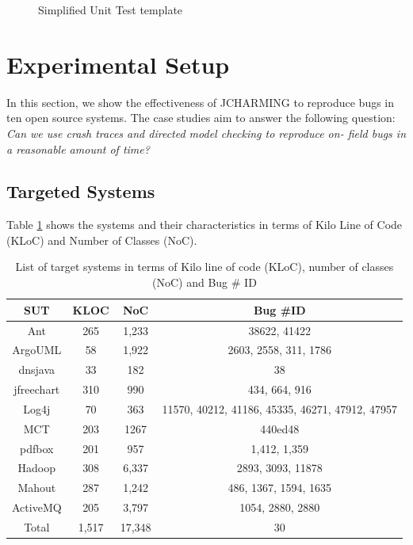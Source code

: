 \documentclass[12pt]{report}
\begin{document}
\begin{figure}[h!]

\noindent\fbox{%
    \parbox{\textwidth}{%
    
}%
}
    \caption{Simplified Unit Test template
    \label{fig:jcharming-unittemplate}}
\end{figure}

\section{\texorpdfstring{Experimental
Setup\label{sec:cases}}{Experimental Setup}}\label{experimental-setup-3}

In this section, we show the effectiveness of JCHARMING to reproduce
bugs in ten open source systems. The case studies aim to answer the
following question: \emph{Can we use crash traces and directed model
checking to reproduce on- field bugs in a reasonable amount of time?}

\subsection{Targeted Systems}\label{targeted-systems}

Table \ref{tab:jacharming-systems} shows the systems and their
characteristics in terms of Kilo Line of Code (KLoC) and Number of
Classes (NoC).

\begin{table}
\centering

\caption{List of target systems in terms of Kilo line of code (KLoC), number of classes (NoC) and Bug \# ID}
\begin{tabular}{c|c|c|c}
SUT        & KLOC & NoC  & Bug \#ID                                        \\ \hline \hline
Ant        & 265  & 1,233 & 38622, 41422                                    \\
ArgoUML    & 58   & 1,922 & 2603, 2558, 311, 1786                           \\
dnsjava    & 33   & 182  & 38                                              \\
jfreechart & 310  & 990  & 434, 664, 916                                   \\
Log4j      & 70   & 363  & 11570, 40212, 41186, 45335, 46271, 47912, 47957 \\
MCT        & 203  & 1267 & 440ed48                                         \\
pdfbox     & 201  & 957  & 1,412, 1,359 \\
Hadoop     & 308   & 6,337 & 2893, 3093, 11878\\
Mahout     & 287  & 1,242 &  486, 1367, 1594, 1635\\
ActiveMQ   & 205  & 3,797 & 1054, 2880, 2880\\ \hline
Total      & 1,517 & 17,348 & 30 \\
\hline \hline
\end{tabular}
\label{tab:jacharming-systems}
\end{table}
\end{document}
